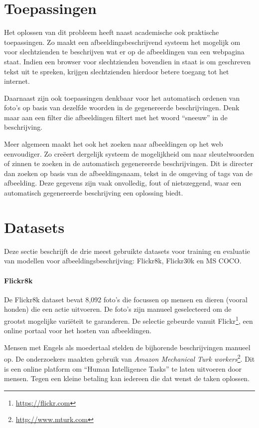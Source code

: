 \section{Toepassingen}
Het oplossen van dit probleem heeft naast academische ook praktische toepassingen. Zo maakt een afbeeldingsbeschrijvend systeem het mogelijk om voor slechtzienden te beschrijven wat er op de afbeeldingen van een webpagina staat. Indien een browser voor slechtzienden bovendien in staat is om geschreven tekst uit te spreken, krijgen slechtzienden hierdoor betere toegang tot het internet.

Daarnaast zijn ook toepassingen denkbaar voor het automatisch ordenen van foto's op basis van dezelfde woorden in de gegenereerde beschrijvingen. Denk maar aan een filter die afbeeldingen filtert met het woord ``sneeuw'' in de beschrijving. 

Meer algemeen maakt het ook het zoeken naar afbeeldingen op het web eenvoudiger. Zo cre\"eert dergelijk systeem de mogelijkheid om naar sleutelwoorden of zinnen te zoeken in de automatisch gegenereerde beschrijvingen. Dit is directer dan zoeken op basis van de afbeeldingsnaam, tekst in de omgeving of tags van de afbeelding. Deze gegevens zijn vaak onvolledig, fout of nietszeggend, waar een automatisch gegenereerde beschrijving een oplossing biedt.


\section{Datasets}
\label{sec:Datasets}
Deze sectie beschrijft de drie meest gebruikte datasets voor training en evaluatie van modellen voor afbeeldingsbeschrijving: Flickr8k, Flickr30k en MS COCO.

\paragraph{Flickr8k}
\label{par:Flickr8k}
De Flickr8k dataset\~\cite{Hodosh2013} bevat 8,092 foto's die focussen op mensen en dieren (vooral honden) die een actie uitvoeren. De foto's zijn manueel geselecteerd om de grootst mogelijke vari\"eteit te garanderen. De selectie gebeurde vanuit Flickr\footnote{\url{https://flickr.com}}, een online portaal voor het hosten van afbeeldingen.

Mensen met Engels als moedertaal stelden de bijhorende beschrijvingen manueel op. De onderzoekers maakten gebruik van \emph{Amazon Mechanical Turk workers}\footnote{\url{http://www.mturk.com}}. Dit is een online platform om ``Human Intelligence Tasks'' te laten uitvoeren door mensen. Tegen een kleine betaling kan iedereen die dat wenst de taken oplossen. 


